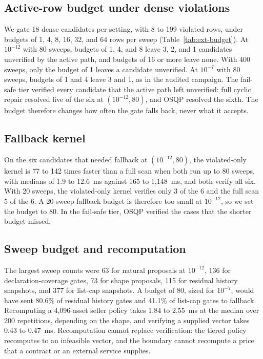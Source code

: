 \documentclass[10pt]{article}
\begin{document}


\subsection{Active-row budget under dense violations}
We gate 18 dense candidates per setting, with 8 to 199 violated rows, under budgets of 1, 4, 8, 16, 32, and 64 rows per sweep (Table~\ref{tab:ext-budget}). At $10^{-12}$ with 80 sweeps, budgets of 1, 4, and 8 leave 3, 2, and 1 candidates unverified by the active path, and budgets of 16 or more leave none. With 400 sweeps, only the budget of 1 leaves a candidate unverified. At $10^{-7}$ with 80 sweeps, budgets of 1 and 4 leave 3 and 1, as in the audited campaign. The fail-safe tier verified every candidate that the active path left unverified: full cyclic repair resolved five of the six at $(10^{-12}, 80)$, and OSQP resolved the sixth. The budget therefore changes how often the gate falls back, never what it accepts.



\subsection{Fallback kernel}
On the six candidates that needed fallback at $(10^{-12}, 80)$, the violated-only kernel is 77 to 142 times faster than a full scan when both run up to 80 sweeps, with medians of 1.9 to 12.6~ms against 165 to 1{,}148~ms, and both verify all six. With 20 sweeps, the violated-only kernel verifies only 3 of the 6 and the full scan 5 of the 6. A 20-sweep fallback budget is therefore too small at $10^{-12}$, so we set the budget to 80. In the fail-safe tier, OSQP verified the cases that the shorter budget missed.

\subsection{Sweep budget and recomputation}
The largest sweep counts were 63 for natural proposals at $10^{-12}$, 136 for declaration-coverage gates, 73 for shape proposals, 115 for residual history snapshots, and 377 for list-cap snapshots. A budget of 80, sized for $10^{-7}$, would have sent 80.6\% of residual history gates and 41.1\% of list-cap gates to fallback. Recomputing a 4{,}096-asset seller policy takes 1.84 to 2.55~ms at the median over 200 repetitions, depending on the shape, and verifying a supplied vector takes 0.43 to 0.47~ms. Recomputation cannot replace verification: the tiered policy recomputes to an infeasible vector, and the boundary cannot recompute a price that a contract or an external service supplies.
\end{document}
